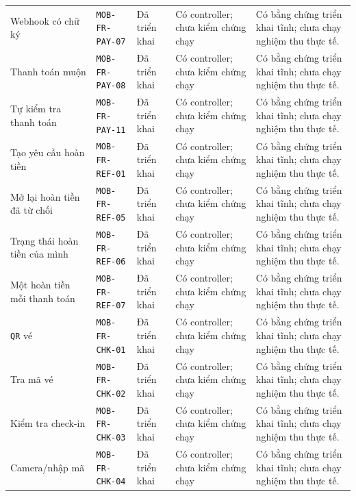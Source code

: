 \begin{longtable}{@{}P{0.19000\SRSWidth}P{0.18000\SRSWidth}P{0.15000\SRSWidth}P{0.20000\SRSWidth}P{0.28000\SRSWidth}@{}}
Webhook có chữ ký & \texttt{MOB-\allowbreak{}FR-\allowbreak{}PAY-\allowbreak{}07} & Đã triển khai & Có controller; chưa kiểm chứng chạy & Có bằng chứng triển khai tĩnh; chưa chạy nghiệm thu thực tế. \\[3pt]
Thanh toán muộn & \texttt{MOB-\allowbreak{}FR-\allowbreak{}PAY-\allowbreak{}08} & Đã triển khai & Có controller; chưa kiểm chứng chạy & Có bằng chứng triển khai tĩnh; chưa chạy nghiệm thu thực tế. \\[3pt]
Tự kiểm tra thanh toán & \texttt{MOB-\allowbreak{}FR-\allowbreak{}PAY-\allowbreak{}11} & Đã triển khai & Có controller; chưa kiểm chứng chạy & Có bằng chứng triển khai tĩnh; chưa chạy nghiệm thu thực tế. \\[3pt]
Tạo yêu cầu hoàn tiền & \texttt{MOB-\allowbreak{}FR-\allowbreak{}REF-\allowbreak{}01} & Đã triển khai & Có controller; chưa kiểm chứng chạy & Có bằng chứng triển khai tĩnh; chưa chạy nghiệm thu thực tế. \\[3pt]
Mở lại hoàn tiền đã từ chối & \texttt{MOB-\allowbreak{}FR-\allowbreak{}REF-\allowbreak{}05} & Đã triển khai & Có controller; chưa kiểm chứng chạy & Có bằng chứng triển khai tĩnh; chưa chạy nghiệm thu thực tế. \\[3pt]
Trạng thái hoàn tiền của mình & \texttt{MOB-\allowbreak{}FR-\allowbreak{}REF-\allowbreak{}06} & Đã triển khai & Có controller; chưa kiểm chứng chạy & Có bằng chứng triển khai tĩnh; chưa chạy nghiệm thu thực tế. \\[3pt]
Một hoàn tiền mỗi thanh toán & \texttt{MOB-\allowbreak{}FR-\allowbreak{}REF-\allowbreak{}07} & Đã triển khai & Có controller; chưa kiểm chứng chạy & Có bằng chứng triển khai tĩnh; chưa chạy nghiệm thu thực tế. \\[3pt]
\texttt{QR} vé & \texttt{MOB-\allowbreak{}FR-\allowbreak{}CHK-\allowbreak{}01} & Đã triển khai & Có controller; chưa kiểm chứng chạy & Có bằng chứng triển khai tĩnh; chưa chạy nghiệm thu thực tế. \\[3pt]
Tra mã vé & \texttt{MOB-\allowbreak{}FR-\allowbreak{}CHK-\allowbreak{}02} & Đã triển khai & Có controller; chưa kiểm chứng chạy & Có bằng chứng triển khai tĩnh; chưa chạy nghiệm thu thực tế. \\[3pt]
Kiểm tra check-in & \texttt{MOB-\allowbreak{}FR-\allowbreak{}CHK-\allowbreak{}03} & Đã triển khai & Có controller; chưa kiểm chứng chạy & Có bằng chứng triển khai tĩnh; chưa chạy nghiệm thu thực tế. \\[3pt]
Camera/\allowbreak{}nhập mã & \texttt{MOB-\allowbreak{}FR-\allowbreak{}CHK-\allowbreak{}04} & Đã triển khai & Có controller; chưa kiểm chứng chạy & Có bằng chứng triển khai tĩnh; chưa chạy nghiệm thu thực tế. \\[3pt]

\end{longtable}
